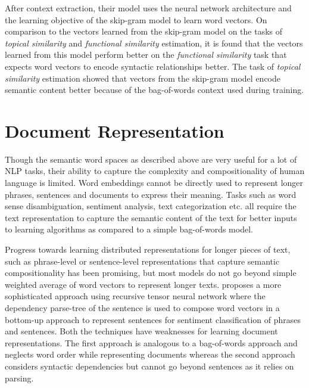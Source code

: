 After context extraction, their model uses the neural network architecture and the learning objective of the skip-gram model to learn word vectors. On comparison to the vectors learned from the skip-gram model on the tasks of \emph{topical similarity} and \emph{functional similarity} estimation, it is found that the vectors learned from this model perform better on the \emph{functional similarity} task that expects word vectors to encode syntactic relationships better. The task of \emph{topical similarity} estimation showed that vectors from the skip-gram model encode semantic content better because of the bag-of-words context used during training.

\section{Document Representation}
\label{sec:document_embeddings}
Though the semantic word spaces as described above are very useful for a lot of NLP tasks, their ability to capture the complexity and compositionality of human language is limited. 
Word embeddings cannot be directly used to represent longer phrases, sentences and documents to express their meaning. 
Tasks such as word sense disambiguation, sentiment analysis, text categorization etc. all require the text representation to capture the semantic content of the text for better inputs to learning algorithms as compared to a simple bag-of-words model. 

Progress towards learning distributed representations for longer pieces of text, such as phrase-level or sentence-level representations \cite{mitchell2010composition, zanzotto2010estimating, yessenalina2011compositional, grefenstette2013multi, mikolov2013distributed} that capture semantic compositionality has been promising, but most models do not go beyond simple weighted average of word vectors to represent longer texts. 
\citet{socher2013recursive} proposes a more sophisticated approach using recursive tensor neural network where the dependency parse-tree of the sentence is used to compose word vectors in a bottom-up approach to represent sentences for sentiment classification of phrases and sentences. 
Both the techniques have weaknesses for learning document representations. The first approach is analogous to a bag-of-words approach and neglects word order while representing documents whereas the second approach considers syntactic dependencies but cannot go beyond sentences as it relies on parsing.

